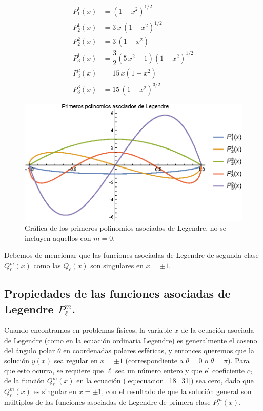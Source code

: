 \begin{align*}
P_{1}^{1} (x) &= (1 - x^{2})^{1/2} \\[0.5em]
P_{2}^{1} (x) &= 3 \, x \, (1 - x^{2})^{1/2} \\[0.5em]
P_{2}^{2} (x) &= 3 \, (1 - x^{2}) \\[0.5em]
P_{3}^{1} (x) &= \dfrac{3}{2}(5 \, x^{2} - 1)(1 - x^{2})^{1/2} \\[0.5em]
P_{3}^{2} (x) &= 15 \, x (1 - x^{2}) \\[0.5em]
P_{3}^{3} (x) &= 15 \, (1 - x^{2})^{3/2}
\end{align*}
\begin{figure}[H]
    \centering
    \includegraphics[scale=1.2]{Imagenes/Plot_Asociados_Lagrange.eps}
    \caption{Gráfica de los primeros polinomios asociados de Legendre, no se incluyen aquellos con $m = 0$.}
    \label{fig:figura_asociados_Legedre}
\end{figure}
Debemos de mencionar que las funciones asociadas de Legendre de segunda clase $Q_{\ell}^{m} (x)$ como las $Q_{\ell} (x)$ son singulares en $x = \pm 1$.

\subsection{Propiedades de las funciones asociadas de Legendre \texorpdfstring{$P_{\ell}^{m}$}{Plm}.}

Cuando encontramos en problemas físicos, la variable $x$ de la ecuación asociada de Legendre (como en la ecuación ordinaria Legendre) es generalmente el coseno del ángulo polar $\theta$ en coordenadas polares esféricas, y entonces queremos que la solución $y (x)$ sea regular en $x = \pm 1$ (correspondiente a $\theta = 0$ o $\theta = \pi$). Para que esto ocurra, se requiere que $\ell$ sea un número entero y que el coeficiente $c_{2}$ de la función $Q_{\ell}^{m} (x)$ en la ecuación (\ref{eq:ecuacion_18_31}) sea cero, dado que $Q_{\ell}^{m} (x)$ es singular en $x = \pm 1$, con el resultado de que la solución general son múltiplos de las funciones asociadas de Legendre de primera clase $P_{\ell}^{m}(x)$.

